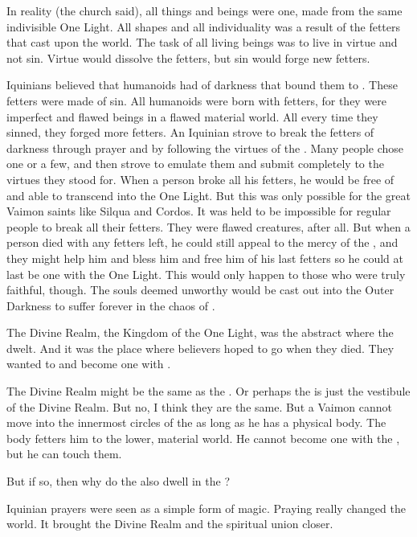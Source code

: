   In reality (the church said), all things and beings were one, made from the same indivisible One Light. 
  All shapes and all individuality was a result of the fetters that \itzach cast upon the world. 
  The task of all living beings was to live in virtue and not sin.
  Virtue would dissolve the fetters, but sin would forge new fetters. 
  
  Iquinians believed that humanoids had  of darkness that bound them to \itzach. 
  These fetters were made of sin. 
  All humanoids were born with fetters, for they were imperfect and flawed beings in a flawed material world. 
  All every time they sinned, they forged more fetters. 
  An Iquinian strove to break the fetters of darkness through prayer and by following the virtues of the \sephiroth. 
  Many people chose one \sephirah or a few, and then strove to emulate them and submit completely to the virtues they stood for. 
  When a person broke all his fetters, he would be free of \itzach and able to transcend into the One Light. 
  But this was only possible for the great Vaimon saints like Silqua and Cordos. 
  It was held to be impossible for regular people to break all their fetters. 
  They were flawed creatures, after all.
  But when a person died with any fetters left, he could still appeal to the mercy of the \sephiroth, and they might help him and bless him and free him of his last fetters so he could at last be one with the One Light. 
  This would only happen to those who were truly faithful, though. 
  The souls deemed unworthy would be cast out into the Outer Darkness to suffer forever in the chaos of \itzach.
  
  The Divine Realm, the Kingdom of the One Light, was the abstract  where the \sephiroth dwelt.
  And it was the place where believers hoped to go when they died.
  They wanted to  and become one with \iquin. 
  
  The Divine Realm might be the same as the \empyrean. 
  Or perhaps the \empyrean is just the vestibule of the Divine Realm.
  But no, I think they are the same. 
  But a Vaimon cannot move into the innermost circles of the \empyrean as long as he has a physical body.
  The body fetters him to the lower, material world.
  He cannot become one with the \sephiroth, but he can touch them. 
  
  But if so, then why do the \qliphoth also dwell in the \empyrean? 

  Iquinian prayers were seen as a simple form of magic. 
  Praying really changed the world. 
  It brought the Divine Realm and the spiritual union closer. 
  
